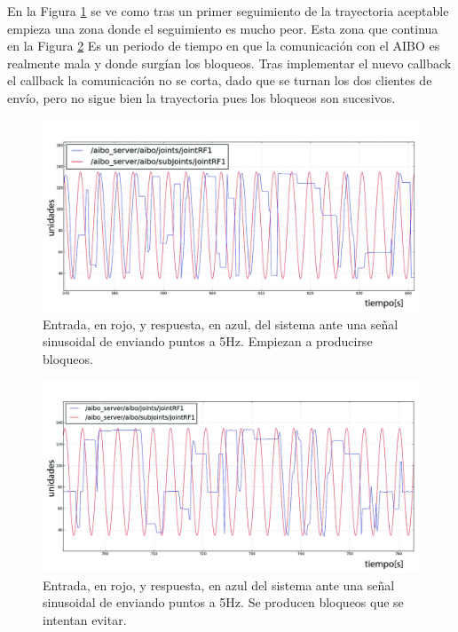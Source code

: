 \documentclass[12pt,a4paper,final,twoside]{book}
\begin{document}
En la Figura \ref{fig:ASempiezamala} se ve como tras un primer seguimiento de la trayectoria aceptable empieza una zona donde el seguimiento es mucho peor. Esta zona que continua en la Figura \ref{fig:ASpeor} Es un periodo de tiempo en que la comunicación con el AIBO es realmente mala y donde surgían los bloqueos. Tras implementar el nuevo callback el callback la comunicación no se corta, dado que se turnan los dos clientes de envío, pero no sigue bien la trayectoria pues los bloqueos son sucesivos.

\begin{figure}[H]
	\centering
    \includegraphics[scale=0.2]{images/empiezamala.jpg}
 	\caption{Entrada, en rojo, y respuesta, en azul, del sistema ante una señal sinusoidal de enviando puntos a 5Hz. Empiezan a producirse bloqueos.}
  \label{fig:ASempiezamala}
\end{figure}
\begin{figure}[H]
	\centering
    \includegraphics[scale=0.2]{images/peora5hz.jpg}
 	\caption{Entrada, en rojo, y respuesta, en azul del sistema ante una señal sinusoidal de enviando puntos a 5Hz. Se producen bloqueos que se intentan evitar.}
  \label{fig:ASpeor}
\end{figure}
\end{document}
